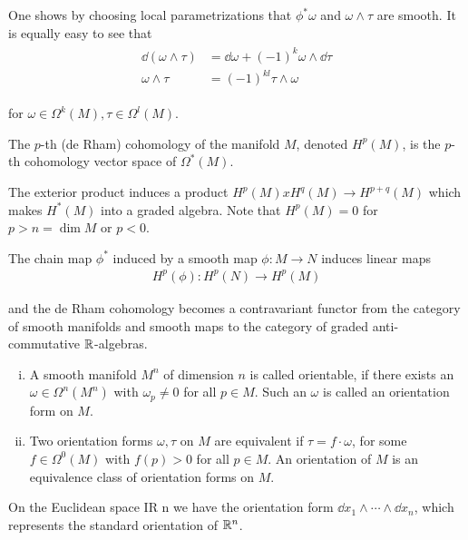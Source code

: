 One shows by choosing local parametrizations that $\phi^*\omega$ and $\omega\wedge\tau$ are smooth.
It is equally easy to see that
\begin{align}
  \begin{aligned}
    \dd(\omega\wedge\tau) & = \dd\omega + (-1)^k\omega\wedge\dd\tau \\
    \omega\wedge\tau & = (-1)^{kl}\tau\wedge\omega
  \end{aligned}
\end{align}

for $\omega\in\Omega^k(M), \tau\in\Omega^l(M)$.

\begin{definition}\label{def:9-7}
  The $p$-th (de Rham) cohomology of the manifold $M$, denoted $H^p(M)$, is the $p$-th cohomology 
  vector space of $\Omega^*(M)$.
\end{definition}

The exterior product induces a product $H^p(M) x H^q(M)\to H^{p+q}(M)$ which
makes $H^*(M)$ into a graded algebra. Note that $H^p(M) = 0$ for $p> n = \dim M$
or $p<0$.

The chain map $\phi^*$ induced by a smooth map $\phi:M\to N$ induces linear maps 
\begin{align*}
  H^p(\phi):H^p(N)\to H^p(M)
\end{align*}

and the de Rham cohomology becomes a contravariant functor from the category
of smooth manifolds and smooth maps to the category of graded anti-commutative
$\mathbb{R}$-algebras.


\begin{definition}\label{def:9-8}\;\par
  \begin{enumerate}[(i)]
    \item A smooth manifold $M^n$ of dimension $n$ is called orientable, if there exists
      an $\omega\in\Omega^n(M^n)$ with $\omega_p \neq 0$ for all $p\in M$. Such an $\omega$ is
      called an orientation form on $M$.
    \item Two orientation forms $\omega, \tau$ on $M$ are equivalent if $\tau=f\cdot \omega$, for 
      some $f\in\Omega^0(M)$ with $f(p) > 0$ for all $p\in M$. An orientation of $M$ is an
      equivalence class of orientation forms on $M$.
  \end{enumerate}
\end{definition}

On the Euclidean space IR n we have the orientation form $\dd x_1\wedge\cdots\wedge\dd x_n$, which
represents the standard orientation of $\mathbb{R}^n$.

